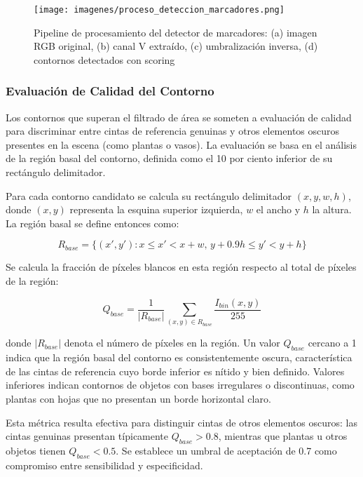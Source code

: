 \begin{figure}[h]
\centering
\texttt{[image: imagenes/proceso\_deteccion\_marcadores.png]}
\caption{Pipeline de procesamiento del detector de marcadores: (a) imagen RGB original, (b) canal V extraído, (c) umbralización inversa, (d) contornos detectados con scoring}
\label{fig:proceso_marcadores}
\end{figure}

\subsubsection{Evaluación de Calidad del Contorno}

Los contornos que superan el filtrado de área se someten a evaluación de calidad para discriminar entre cintas de referencia genuinas y otros elementos oscuros presentes en la escena (como plantas o vasos). La evaluación se basa en el análisis de la región basal del contorno, definida como el 10 por ciento inferior de su rectángulo delimitador.

Para cada contorno candidato se calcula su rectángulo delimitador $(x, y, w, h)$, donde $(x,y)$ representa la esquina superior izquierda, $w$ el ancho y $h$ la altura. La región basal se define entonces como:

\begin{equation}
R_{base} = \{(x',y') : x \leq x' < x+w, \, y+0.9h \leq y' < y+h\}
\end{equation}

Se calcula la fracción de píxeles blancos en esta región respecto al total de píxeles de la región:

\begin{equation}
Q_{base} = \frac{1}{|R_{base}|} \sum_{(x,y) \in R_{base}} \frac{I_{bin}(x,y)}{255}
\end{equation}

donde $|R_{base}|$ denota el número de píxeles en la región. Un valor $Q_{base}$ cercano a 1 indica que la región basal del contorno es consistentemente oscura, característica de las cintas de referencia cuyo borde inferior es nítido y bien definido. Valores inferiores indican contornos de objetos con bases irregulares o discontinuas, como plantas con hojas que no presentan un borde horizontal claro.

Esta métrica resulta efectiva para distinguir cintas de otros elementos oscuros: las cintas genuinas presentan típicamente $Q_{base} > 0.8$, mientras que plantas u otros objetos tienen $Q_{base} < 0.5$. Se establece un umbral de aceptación de 0.7 como compromiso entre sensibilidad y especificidad.

